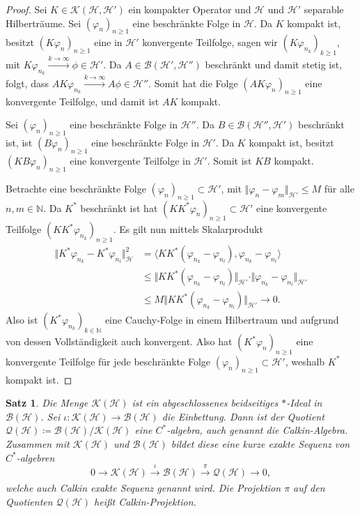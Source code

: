 \documentclass[11pt, hidelinks]{article}
\newcommand{\h}{\mathcal{H}}
\numberwithin{conj}{section}
\newtheorem{theorem}[conj]{Satz}
\begin{document}
\begin{proof}
Sei \( K \in \mathcal{K}(\h, \h') \) ein kompakter Operator und \( \h \) und \( \h' \) separable Hilberträume. Sei \( (\varphi_n)_{n \geq 1} \) eine beschränkte Folge in \( \h \). Da \( K \) kompakt ist, besitzt \( (K\varphi_n)_{n \geq 1} \) eine in \( \h' \) konvergente Teilfolge, sagen wir \( (K\varphi_{n_k})_{k \geq 1} \), mit \( K\varphi_{n_k} \xrightarrow[]{k \rightarrow \infty} \phi \in \h' \). Da \( A \in \mathcal{B}(\h', \h'') \) beschränkt und damit stetig ist, folgt, dass \( A K\varphi_{n_k} \xrightarrow[]{k \rightarrow \infty} A\phi \in \h'' \). Somit hat die Folge \( (AK\varphi_n)_{n \geq 1} \) eine konvergente Teilfolge, und damit ist \( AK \) kompakt.

Sei \( (\varphi_n)_{n \geq 1} \) eine beschränkte Folge in \( \h'' \). Da \( B \in \mathcal{B}(\h'', \h') \) beschränkt ist, ist \( (B\varphi_n)_{n \geq 1} \) eine beschränkte Folge in \( \h' \). Da \( K \) kompakt ist, besitzt \( (KB\varphi_n)_{n \geq 1} \) eine konvergente Teilfolge in \( \h' \). Somit ist \( KB \) kompakt.

Betrachte eine beschränkte Folge $(\varphi_n)_{n \geq 1} \subset \h'$, mit $\Vert \varphi_n - \varphi_m \Vert_{\h'} \leq M$ für alle $n,m \in \mathbb{N}$. Da $K^\ast$ beschränkt ist hat $(KK^\ast\varphi_n)_{n \geq 1} \subset \h'$ eine konvergente Teilfolge $(KK^\ast\varphi_{n_k})_{n \geq 1}$. Es gilt nun mittels Skalarprodukt
\begin{align}
    \Vert K^\ast \varphi_{n_k} - K^\ast\varphi_{n_l} \Vert^2_\h &= \langle KK^\ast (\varphi_{n_k} - \varphi_{n_l}), \varphi_{n_k} - \varphi_{n_l} \rangle \\
    &\leq \Vert KK^\ast (\varphi_{n_k} - \varphi_{n_l}) \Vert_{\h'} \cdot \Vert \varphi_{n_k} - \varphi_{n_l} \Vert_{\h'} \\
    &\leq M \Vert KK^\ast (\varphi_{n_k} - \varphi_{n_l}) \Vert_{\h'} \to 0.
\end{align}
Also ist $(K^\ast \varphi_{n_k})_{k \in \mathbb{N}}$ eine Cauchy-Folge in einem Hilbertraum und aufgrund von dessen Vollständigkeit auch konvergent. Also hat $(K^\ast \varphi_{n})_{n \geq 1}$ eine konvergente Teilfolge für jede beschränkte Folge $(\varphi_n)_{n \geq 1} \subset \h'$, weshalb $K^\ast$ kompakt ist.
\end{proof}

\begin{theorem}
Die Menge $\mathcal{K}(\h)$ ist ein abgeschlossenes beidseitiges $\ast$-Ideal in $\mathcal{B}(\h)$. Sei $\iota: \mathcal{K}(\h) \to \mathcal{B}(\h)$ die Einbettung. Dann ist der Quotient $\mathcal{Q}(\h) \coloneq \mathcal{B}(\h)/\mathcal{K}(\h)$ eine $C^\ast$-algebra, auch genannt die Calkin-Algebra. Zusammen mit $\mathcal{K}(\h)$ und $\mathcal{B}(\h)$ bildet diese eine kurze exakte Sequenz von $C^\ast$-algebren
\begin{equation}
    0 \to \mathcal{K}(\h) \xrightarrow[]{\iota} \mathcal{B}(\h) \xrightarrow[]{\pi} \mathcal{Q}(\h) \to 0,
\end{equation}
welche auch Calkin exakte Sequenz genannt wird. Die Projektion $\pi$ auf den Quotienten $\mathcal{Q}(\h)$ heißt Calkin-Projektion.
\end{theorem}
\end{document}
